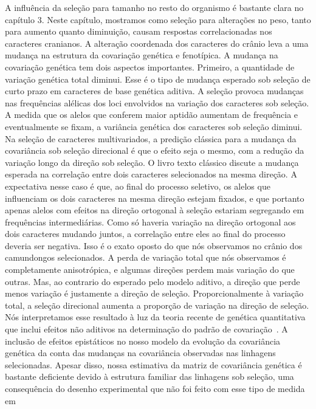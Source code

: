 \begin{refsection}
A influência da seleção para tamanho no resto do organismo é bastante clara no
capítulo 3. Neste capítulo, mostramos como seleção para alterações no peso,
tanto para aumento quanto diminuição, causam respostas correlacionadas nos
caracteres cranianos. A alteração coordenada dos caracteres do crânio leva a
uma mudança na estrutura da covariação genética e fenotípica. A mudança na
covariação genética tem dois aspectos importantes. Primeiro, a quantidade de
variação genética total diminui. Esse é o tipo de mudança esperado sob seleção
de curto prazo em caracteres de base genética aditiva. A seleção provoca
mudanças nas frequências alélicas dos loci envolvidos na variação dos
caracteres sob seleção. A medida que os alelos que conferem maior aptidão
aumentam de frequência e eventualmente se fixam, a variância genética dos
caracteres sob seleção diminui. Na seleção de caracteres multivariados, a
predição clássica para a mudança da covariância sob seleção direcional é que o
efeito seja o mesmo, com a redução da variação longo da direção sob seleção. O
livro texto clássico \textcite{Falconer1996-ot} discute a mudança esperada na
correlação entre dois caracteres selecionados na mesma direção. A expectativa
nesse caso é que, ao final do processo seletivo, os alelos que influenciam os
dois caracteres na mesma direção estejam fixados, e que portanto apenas alelos
com efeitos na direção ortogonal à seleção estariam segregando em frequências
intermediárias. Como só haveria variação na direção ortogonal aos dois
caracteres mudando juntos, a correlação entre eles ao final do processo
deveria ser negativa. Isso é o exato oposto do que nós observamos no crânio
dos camundongos selecionados. A perda de variação total que nós observamos é
completamente anisotrópica, e algumas direções perdem mais variação do que
outras. Mas, ao contrario do esperado pelo modelo aditivo, a direção que perde
menos variação é justamente a direção de seleção. Proporcionalmente à variação
total, a seleção direcional aumenta a proporção de variação na direção de
seleção. Nós interpretamos esse resultado à luz da teoria recente de genética
quantitativa que inclui efeitos não aditivos na determinação do padrão de
covariação~\parencite{Pavlicev2011-wz, Cheverud2001-ho}. A inclusão de efeitos
epistáticos no nosso modelo da evolução da covariância genética da conta das
mudanças na covariância observadas nas linhagens selecionadas. Apesar disso,
nossa estimativa da matriz de covariância genética é bastante deficiente
devido à estrutura familiar das linhagens sob seleção, uma consequência do
desenho experimental que não foi feito com esse tipo de medida em

\end{refsection}
